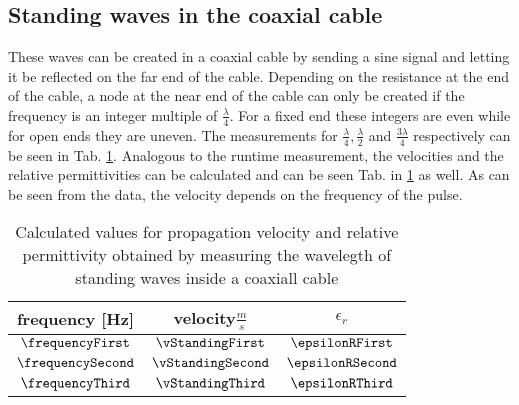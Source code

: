 \documentclass[a4paper,10pt,twocolumn]{article}
\begin{document}
    \subsection{Standing waves in the coaxial cable}
    \label{subsec:standingWavesCoax}
    These waves can be created in a coaxial cable by sending a sine signal and letting it be reflected on the far end of the cable.
    Depending on the resistance at the end of the cable, a node at the near end of the cable can only be created if the frequency is an integer multiple of $\frac{\lambda}{4}$.
    For a fixed end these integers are even while for open ends they are uneven.
    The measurements for $\frac{\lambda}{4},\frac{\lambda}{2}$ and $\frac{3\lambda}{4}$ respectively can be seen in Tab. \ref{tab:standingWaveData}.
    Analogous to the runtime measurement, the velocities and the relative permittivities can be calculated and can be seen Tab. in \ref{tab:standingWaveData} as well.
    As can be seen from the data, the velocity depends on the frequency of the pulse.
    \begin{table}[htbp]          %
        \centering
        \fontsize{8pt}{8pt}
        \begin{tabular*}{\linewidth}{@{\extracolsep{\fill}}ccc}
            \hline
            \hline
            \rule[-5pt]{0pt}{23pt}  frequency [Hz]  & velocity$ \frac{m}{s}$ & $\epsilon_r$   	 \\
            \hline
            \rule[-5pt]{0pt}{23pt}  \tiny $ \frequencyFirst$ & \tiny$ \vStandingFirst$ &   \tiny$ \epsilonRFirst$  	 \\
            \rule[-5pt]{0pt}{23pt}    \tiny$\frequencySecond$ & \tiny$ \vStandingSecond$ &   \tiny$ \epsilonRSecond$  	 \\
            \rule[-5pt]{0pt}{23pt}   \tiny$ \frequencyThird$ & \tiny$ \vStandingThird$ &   \tiny$ \epsilonRThird$  	 \\
            \hline
            \hline
        \end{tabular*}
        \caption[]{Calculated values for propagation velocity and relative permittivity obtained by measuring the wavelegth of standing waves inside a coaxiall cable}  %
        \label{tab:standingWaveData}                             %
    \end{table} 
    
\end{document}
